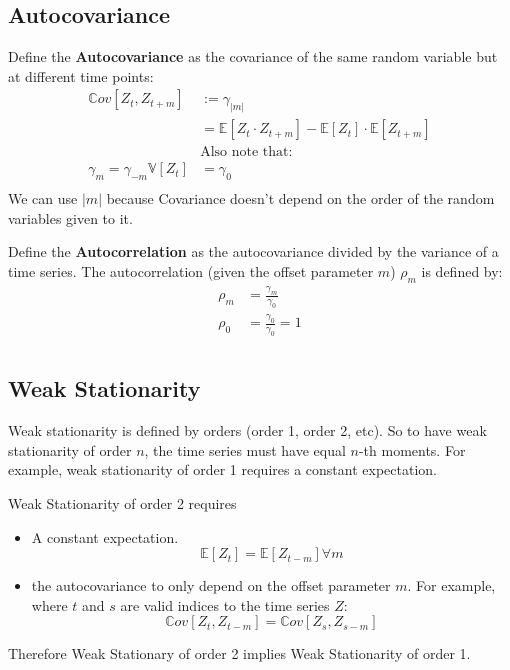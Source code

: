 \subsection{Autocovariance}
Define the \textbf{Autocovariance} as the covariance of the same random
variable but at different time points:
\begin{equation*}
    \begin{aligned}
        \mathbb{C}ov[Z_t, Z_{t+m}] &:= \gamma_{|m|} \\ 
                &= \mathbb{E}[Z_t \cdot Z_{t+m}] - \mathbb{E}[Z_t] \cdot
                \mathbb{E}[Z_{t+m}] \\
        &\text{Also note that:} \\
        \gamma_m = \gamma_{-m}
        \mathbb{V}[Z_t] &= \gamma_0 \\
    \end{aligned}
\end{equation*}
We can use $|m|$ because Covariance doesn't depend on the order of
the random variables given to it. 

Define the \textbf{Autocorrelation} as the autocovariance divided by the
variance of a time series. The autocorrelation (given the offset parameter
$m$) $\rho_m$ is defined by:
\begin{equation*}
    \begin{aligned}
        \rho_m &= \frac{\gamma_m}{\gamma_0} \\
        \rho_0 &= \frac{\gamma_0}{\gamma_0} = 1 \\
    \end{aligned}
\end{equation*}


\subsection{Weak Stationarity}

Weak stationarity is defined by orders (order 1, order 2, etc). So to have weak
stationarity of order $n$, the time series must have equal $n$-th moments.
For example, weak stationarity of order 1 requires a constant expectation.

Weak Stationarity of order 2 requires 
\begin{itemize}
    \item A constant expectation.
    \begin{equation*}
        \mathbb{E}[Z_t] = \mathbb{E}[Z_{t-m}]  \forall m
    \end{equation*}
        
    \item the autocovariance to only depend on the offset parameter $m$. For
        example, where $t$ and $s$ are valid indices to the time series $Z$:
    \begin{equation*}
        \mathbb{C}ov[Z_t, Z_{t-m}] = \mathbb{C}ov[Z_s, Z_{s-m}] 
    \end{equation*}
\end{itemize}
Therefore Weak Stationary of order 2 implies Weak Stationarity of order 1.

